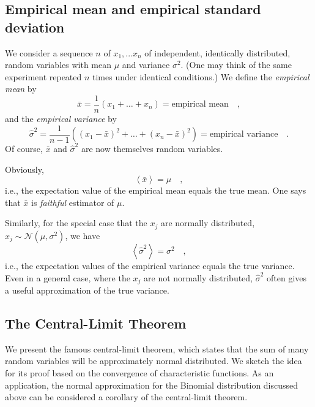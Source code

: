 \documentclass{notebook}
\begin{document}
\subsection{Empirical mean and empirical standard deviation}

We consider a sequence $n$ of $x_1, ... x_n$ of independent, identically distributed, random variables with mean $\mu$ and variance $\sigma^2$.  (One may think of the same experiment repeated $n$ times under identical conditions.) We define the \textit{empirical mean} by
%
\begin{equation}
\bar{x} = \frac{1}{n}(x_1 + \dots + x_n) = \text{empirical mean} \quad,
\end{equation}
%
and the \textit{empirical variance} by 
%
\begin{equation}
\widehat{\sigma}^2 = \frac{1}{n-1} \left(
	\left(x_1-\bar{x}\right)^2  + \dots + \left(x_n-\bar{x}\right)^2
	\right)
	= \text{empirical variance} \quad.
\end{equation}
%
Of course, $\bar{x}$ and $\widehat{\sigma}^2$ are now themselves random variables.

Obviously, 
\begin{equation}
\left\langle \bar{x} \right\rangle = \mu \quad,
\end{equation}
i.e., the expectation value of the empirical mean equals the true mean. One says that $\bar{x}$ is \textit{faithful} estimator of $\mu$.

Similarly, for the special case that the $x_j$ are normally distributed, 
$x_j\sim\mathcal{N}(\mu,\sigma^2)$,
we have
\begin{equation}
\left\langle \widehat{\sigma}^2 \right\rangle = \sigma^2 \quad,
\end{equation}
i.e., the expectation values of the empirical variance equals the true variance.
Even in a general case, where the $x_j$ are not normally distributed, 
$\widehat{\sigma}^2$ often gives a useful approximation of the true variance.


\subsection{The Central-Limit Theorem}

We present the famous central-limit theorem,  which states that the sum of many random variables will be approximately normal distributed. We sketch the idea for its proof based on the convergence of characteristic functions. As an application, the normal approximation for the Binomial distribution discussed above can be considered a corollary of the central-limit theorem.
\end{document}
